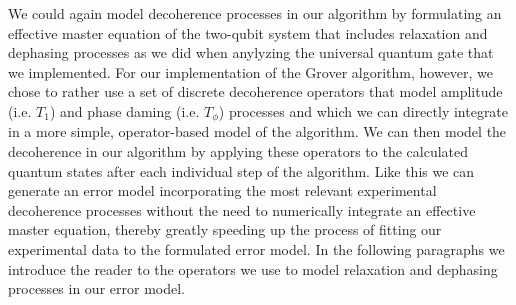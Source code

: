We could again model decoherence processes in our algorithm by formulating an effective master equation of the two-qubit system that includes relaxation and dephasing processes as we did when anylyzing the universal quantum gate that we implemented. For our implementation of the Grover algorithm, however, we chose to rather use a set of discrete decoherence operators that model amplitude (i.e. $T_1$) and phase daming (i.e. $T_\phi$) processes and which we can directly integrate in a more simple, operator-based model of the algorithm. We can then model the decoherence in our algorithm by applying these operators to the calculated quantum states after each individual step of the algorithm. Like this we can generate an error model incorporating the most relevant experimental decoherence processes without the need to numerically integrate an effective master equation, thereby greatly speeding up the process of fitting our experimental data to the formulated error model. In the following paragraphs we introduce the reader to the operators we use to model relaxation and dephasing processes in our error model.

\smallskip

